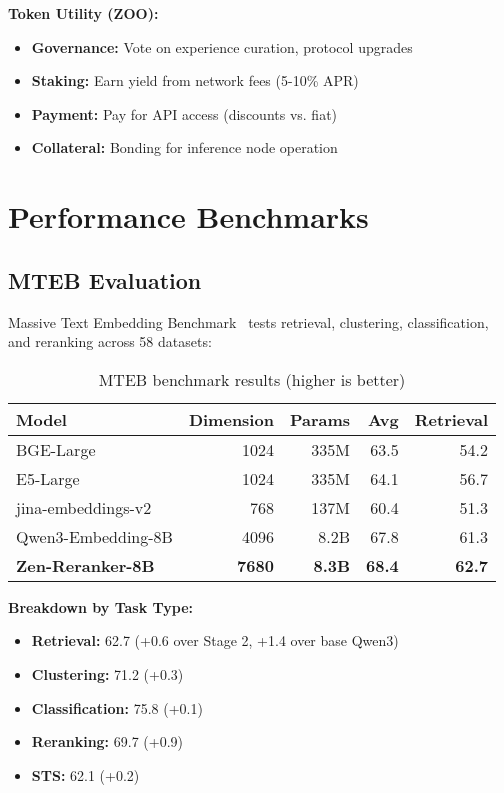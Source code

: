 \documentclass[11pt,a4paper]{article}
\begin{document}
\textbf{Token Utility (ZOO):}
\begin{itemize}
\item \textbf{Governance:} Vote on experience curation, protocol upgrades
\item \textbf{Staking:} Earn yield from network fees (5-10\% APR)
\item \textbf{Payment:} Pay for API access (discounts vs. fiat)
\item \textbf{Collateral:} Bonding for inference node operation
\end{itemize}

\section{Performance Benchmarks}

\subsection{MTEB Evaluation}

Massive Text Embedding Benchmark~\cite{muennighoff2023mteb} tests retrieval, clustering, classification, and reranking across 58 datasets:

\begin{table}[h]
\centering
\caption{MTEB benchmark results (higher is better)}
\begin{tabular}{lrrrr}
\toprule
\textbf{Model} & \textbf{Dimension} & \textbf{Params} & \textbf{Avg} & \textbf{Retrieval} \\
\midrule
BGE-Large & 1024 & 335M & 63.5 & 54.2 \\
E5-Large & 1024 & 335M & 64.1 & 56.7 \\
jina-embeddings-v2 & 768 & 137M & 60.4 & 51.3 \\
Qwen3-Embedding-8B & 4096 & 8.2B & 67.8 & 61.3 \\
\textbf{Zen-Reranker-8B} & \textbf{7680} & \textbf{8.3B} & \textbf{68.4} & \textbf{62.7} \\
\bottomrule
\end{tabular}
\end{table}

\textbf{Breakdown by Task Type:}
\begin{itemize}
\item \textbf{Retrieval:} 62.7 (+0.6 over Stage 2, +1.4 over base Qwen3)
\item \textbf{Clustering:} 71.2 (+0.3)
\item \textbf{Classification:} 75.8 (+0.1)
\item \textbf{Reranking:} 69.7 (+0.9)
\item \textbf{STS:} 62.1 (+0.2)
\end{itemize}
\end{document}
